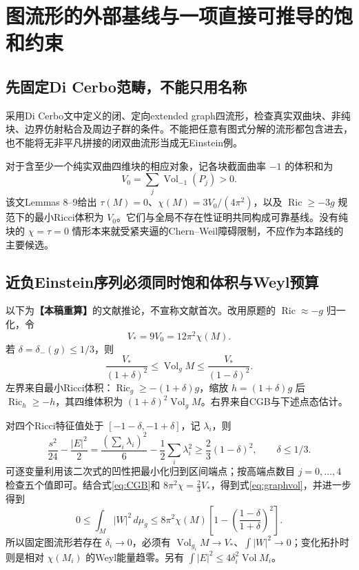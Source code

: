 \documentclass[UTF8,a4paper,11pt,fontset=fandol]{ctexart}
\numberwithin{equation}{section}
\theoremstyle{definition}
\newcommand{\Ric}{\operatorname{Ric}}
\newcommand{\Vol}{\operatorname{Vol}}
\newcommand{\dd}{\,d\mu_g}
\newcommand{\status}[1]{\textbf{【#1】}}
\begin{document}
\section{图流形的外部基线与一项直接可推导的饱和约束}
\subsection{先固定Di Cerbo范畴，不能只用名称}
采用Di Cerbo文中定义的闭、定向extended graph四流形，检查真实双曲块、非纯块、边界仿射粘合及周边子群的条件\cite{DiCerbo}。不能把任意有图式分解的流形都包含进去，也不能将无非平凡拼接的闭双曲流形当成无Einstein例。

对于含至少一个纯实双曲四维块的相应对象，记各块截面曲率 $-1$ 的体积和为
\[
V_0=\sum_j\Vol_{-1}(P_j)>0.
\]
该文Lemmas 8--9给出 $\tau(M)=0$、$\chi(M)=3V_0/(4\pi^2)$，以及 $\Ric\ge-3g$ 规范下的最小Ricci体积为 $V_0$。它们与全局不存在性证明共同构成可靠基线。没有纯块的 $\chi=\tau=0$ 情形本来就受紧夹逼的Chern--Weil障碍限制，不应作为本路线的主要候选。

\subsection{近负Einstein序列必须同时饱和体积与Weyl预算}
以下为\status{本稿重算}的文献推论，不宣称文献首次。改用原题的 $\Ric\approx-g$ 归一化，令
\[
V_*=9V_0=12\pi^2\chi(M).
\]
若 $\delta=\delta_-(g)\le1/3$，则
\begin{equation}\label{eq:graphvol}
\boxed{\frac{V_*}{(1+\delta)^2}\le\Vol_gM
\le\frac{V_*}{(1-\delta)^2}.}
\end{equation}
左界来自最小Ricci体积：$\Ric_g\ge-(1+\delta)g$，缩放 $h=(1+\delta)g$ 后 $\Ric_h\ge-h$，其四维体积为 $(1+\delta)^2\Vol_gM$。右界来自CGB与下述点态估计。

对四个Ricci特征值处于 $[-1-\delta,-1+\delta]$，记 $\lambda_i$，则
\[
\frac{s^2}{24}-\frac{|E|^2}{2}
=\frac{(\sum_i\lambda_i)^2}{6}-\frac12\sum_i\lambda_i^2
\ge\frac23(1-\delta)^2,\qquad\delta\le1/3.
\]
可逐变量利用该二次式的凹性把最小化归到区间端点；按高端点数目 $j=0,\dots,4$ 检查五个值即可。结合式\eqref{eq:CGB}和 $8\pi^2\chi=\frac23V_*$，得到式\eqref{eq:graphvol}，并进一步得到
\begin{equation}\label{eq:graphW}
\boxed{0\le\int_M|W|^2\dd\le8\pi^2\chi(M)
\left[1-\left(\frac{1-\delta}{1+\delta}\right)^2\right].}
\end{equation}
所以固定图流形若存在 $\delta_i\to0$，必须有 $\Vol_{g_i}M\to V_*$、$\int|W|^2\to0$；变化拓扑时则是相对 $\chi(M_i)$ 的Weyl能量趋零。另有 $\int|E|^2\le4\delta_i^2\Vol M_i$。
\end{document}
